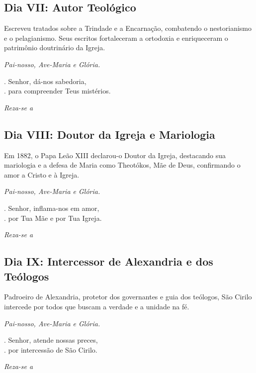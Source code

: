 \documentclass[18pt]{article}
\makeatletter
\newcommand{\vers@resp@sym}{%
  \raisebox{0.2ex}{\rotatebox[origin=c]{-20}{$\m@th\rceil$}}%
}
\newcommand{\vers@resp}[2]{%
  {\ooalign{%
     \hidewidth\kern#1\vers@resp@sym\hidewidth\cr
     #2\cr
  }}%
}
\DeclareRobustCommand{\versicle}{\vers@resp{-0.1em}{V}}
\DeclareRobustCommand{\response}{\vers@resp{0pt}{R}}
\makeatother
\begin{document}
\subsection*{Dia VII: Autor Teológico}
\begin{justify}
Escreveu tratados sobre a Trindade e a Encarnação, combatendo o nestorianismo e o pelagianismo. Seus escritos fortaleceram a ortodoxia e enriqueceram o patrimônio doutrinário da Igreja.

\vspace{0.3cm}
\textit{Pai-nosso, Ave-Maria e Glória.}

\noindent
\versicle. Senhor, dá-nos sabedoria,\\
\response. para compreender Teus mistérios.

\textit{Reza-se a }
\end{justify}

\subsection*{Dia VIII: Doutor da Igreja e Mariologia}
\begin{justify}
Em 1882, o Papa Leão XIII declarou-o Doutor da Igreja, destacando sua mariologia e a defesa de Maria como Theotókos, Mãe de Deus, confirmando o amor a Cristo e à Igreja.

\vspace{0.3cm}
\textit{Pai-nosso, Ave-Maria e Glória.}

\noindent
\versicle. Senhor, inflama-nos em amor,\\
\response. por Tua Mãe e por Tua Igreja.

\textit{Reza-se a }
\end{justify}

\subsection*{Dia IX: Intercessor de Alexandria e dos Teólogos}
\begin{justify}
Padroeiro de Alexandria, protetor dos governantes e guia dos teólogos, São Cirilo intercede por todos que buscam a verdade e a unidade na fé.

\vspace{0.3cm}
\textit{Pai-nosso, Ave-Maria e Glória.}

\noindent
\versicle. Senhor, atende nossas preces,\\
\response. por intercessão de São Cirilo.

\textit{Reza-se a }
\end{justify}
\end{document}
